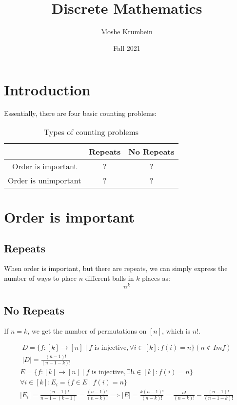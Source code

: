 \documentclass[00_complete]{subfiles}
\title{Discrete Mathematics}
\author{Moshe Krumbein}
\date{Fall 2021}
\begin{document}

\section{Introduction}

Essentially, there are four basic counting problems:
\begin{table}[ht]
\centering
{\renewcommand{\arraystretch}{1.2}%
\begin{tabular}{ccc}
 \hline
& Repeats & No Repeats \\
 \hline
    Order is important & ?&? \\
    Order is unimportant & ?&? \\
 \hline
\end{tabular}}
\caption{Types of counting problems}
\end{table}

\section{Order is important}
\subsection{Repeats}
When order is important, but there are repeats, we can simply express the
number of ways to place $n$ different balls in $k$ places as:
$$n^k$$
\subsection{No Repeats}

If $n=k$, we get the number of permutations on $[n]$, which is $n!$.

$$
\begin{gathered}
    D=\{f:[k]\to[n] \mid f \text{ is injective}, \forall i \in [k]: f(i)=n\} (n
    \notin Imf) \\
    |D|= \frac{(n-1)!}{(n-1-k)!}
\end{gathered}
$$
$$
\begin{gathered}
    E=\{f:[k]\to[n] \mid f \text{ is injective}, \exists! i \in [k]: f(i)=n\}
    \\
    \forall i \in[k]: E_i = \{f \in E \mid f(i) = n \} \\
    |E_i| =\frac{(n-1)!}{n-1-(k-1)} = \frac{(n-1)!}{(n-k)!} \implies |E| = \frac{k(n-1)!}{(n-k)!}
    = \frac{n!}{(n-k)!} - \frac{(n-1)!}{(n-1-k)!}
\end{gathered}
$$
\end{document}
